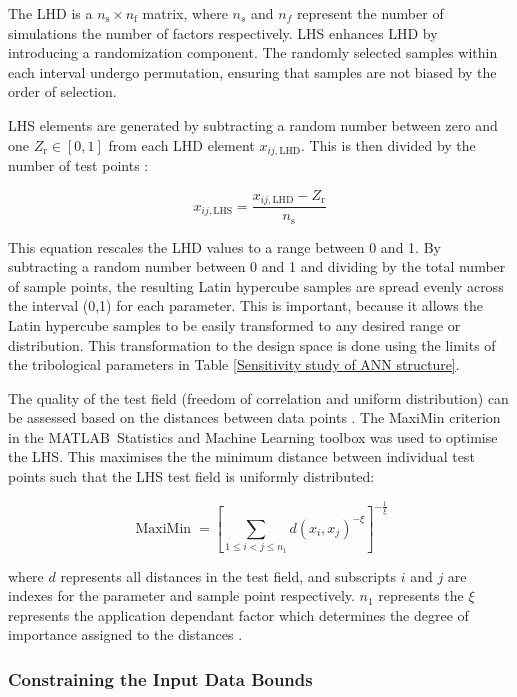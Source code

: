 The LHD is a $n_{\mathrm{s}} \times n_{\mathrm{f}}$ matrix, where $n_s$ and $n_f$ represent the number of simulations the number of factors respectively. LHS enhances LHD by introducing a randomization component. The randomly selected samples within each interval undergo permutation, ensuring that samples are not biased by the order of selection.

LHS elements are generated by subtracting a random number between zero and one $Z_{\mathrm{r}}\in[0,1]$ from each LHD element $x_{i j, \mathrm{LHD}}$. This is then divided by the number of test points \cite{Siebertz2010}:

\begin{equation}\label{LHS}
	x_{i j, \mathrm{LHS}}=\frac{x_{i j, \mathrm{LHD}}-Z_{\mathrm{r}}}{n_{\mathrm{s}}}
\end{equation}

This equation rescales the LHD values to a range between 0 and 1. By subtracting a random number between 0 and 1 and dividing by the total number of sample points, the resulting Latin hypercube samples are spread evenly across the interval (0,1) for each parameter. This is important, because it allows the Latin hypercube samples to be easily transformed to any desired range or distribution. This transformation to the design space is done using the limits of the tribological parameters in Table \ref{Sensitivity study of ANN structure}.

The quality of the test field (freedom of correlation and uniform distribution) can be assessed based on the distances between data points \cite{Johnson1990}. The MaxiMin criterion in the MATLAB\textregistered\ Statistics and Machine Learning toolbox was used to optimise the LHS. This maximises the the minimum distance between individual test points such that the LHS test field is uniformly distributed:

\begin{equation}\label{maximin}
	\operatorname{MaxiMin}=\left[\sum_{1 \leq i<j \leq n_1} d\left(x_i, x_j\right)^{-\xi}\right]^{-\frac{1}{\xi}}
\end{equation}

where $d$ represents all distances in the test field, and subscripts $i$ and $j$ are indexes for the parameter and sample point respectively. $n_1$ represents the  $\xi$ represents the application dependant factor which determines the degree of importance assigned to the distances \cite{Siebertz2010}.

\subsubsection{Constraining the Input Data Bounds}

